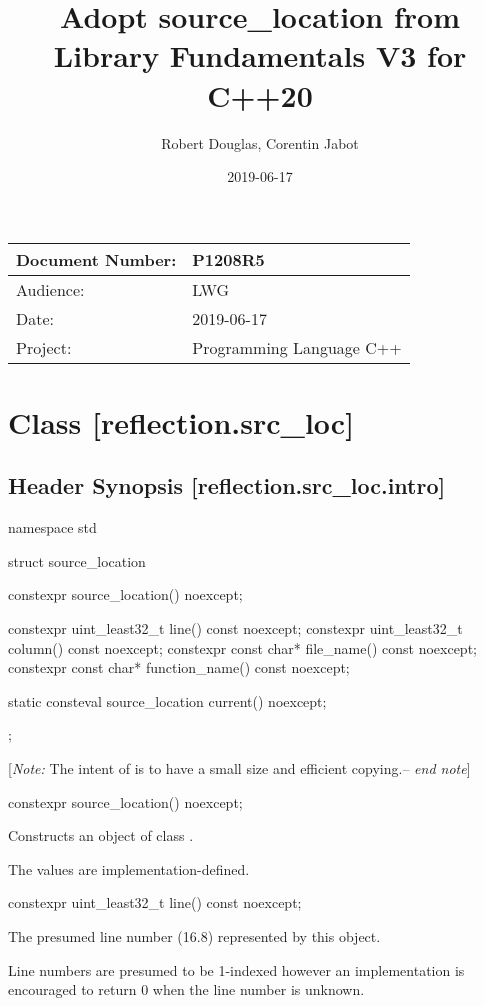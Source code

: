 \documentclass[a4paper,article]{article}
\title{Adopt source\_location from Library Fundamentals V3 for C++20}
\author{Robert Douglas, Corentin Jabot}
\date{2019-06-17}
\begin{document}
\maketitle
\begin{tabular}[t]{|l|l|}\hline
Document Number: &  P1208R5\\\hline
Audience: & LWG\\\hline
Date: &  2019-06-17 \\\hline
Project: & Programming Language C++\\\hline
\end{tabular}

\section{Class  [reflection.src_loc]}
\subsection{Header   Synopsis [reflection.src_loc.intro]}
\begin{codeblock}
namespace std {
  struct source_location {
    constexpr source_location() noexcept;

    constexpr uint_least32_t line() const noexcept;
    constexpr uint_least32_t column() const noexcept;
    constexpr const char* file_name() const noexcept;
    constexpr const char* function_name() const noexcept;

    static consteval source_location current() noexcept;
  };
}
\end{codeblock}
[\emph{Note:} The intent of  is to have a small size and efficient copying.-- \emph{end note}]

\begin{itemdecl}
constexpr source_location() noexcept;
\end{itemdecl}
\begin{itemdescr}
\pnum
\effects
Constructs an object of class .

\pnum
\note
The values are implementation-defined.
\end{itemdescr}

\begin{itemdecl}
constexpr uint_least32_t line() const noexcept;
\end{itemdecl}
\begin{itemdescr}
\pnum
\returns
The presumed line number (16.8) represented by this object.

\note
Line numbers are presumed to be 1-indexed however an implementation is encouraged to return 0 when the line number is unknown.
\end{itemdescr}
\end{document}
